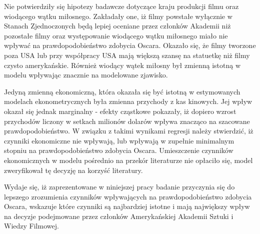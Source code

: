 Nie potwierdziły się hipotezy badawcze dotyczące kraju produkcji filmu oraz wiodącego wątku miłosnego. Zakładały one, iż filmy powstałe wyłącznie w Stanach Zjednoczonych będą lepiej oceniane przez członków Akademii niż pozostałe filmy oraz występowanie wiodącego wątku miłosnego miało nie wpływać na prawdopodobieństwo zdobycia Oscara. Okazało się, że filmy tworzone poza USA lub przy współpracy USA mają większą szansę na statuetkę niż filmy czysto amerykańskie. Również wiodący wątek miłosny był zmienną istotną w modelu wpływając znacznie na modelowane zjawisko. 

Jedyną zmienną ekonomiczną, która okazała się być istotną w estymowanych modelach ekonometrycznych była zmienna przychody z kas kinowych. Jej wpływ okazał się jednak marginalny - efekty cząstkowe pokazały, iż dopiero wzrost przychodów liczony w setkach milionów dolarów wpływa znacząco na szacowane prawdopodobieństwo. W związku z takimi wynikami regresji należy stwierdzić, iż czynniki ekonomiczne nie wpływają, lub wpływają w zupełnie minimalnym stopniu na prawdopodobieństwo zdobycia Oscara. Umieszczenie czynników ekonomicznych w modelu pośrednio na przekór literaturze nie opłaciło się, model zweryfikował tę decyzję na korzyść literatury.

Wydaje się, iż zaprezentowane w niniejszej pracy badanie przyczynia się do lepszego zrozumienia czynników wpływających na prawdopodobieństwo zdobycia Oscara, wskazuje które czynniki są najbardziej istotne i mają największy wpływ na decyzje podejmowane przez członków Amerykańskiej Akademii Sztuki i Wiedzy Filmowej.